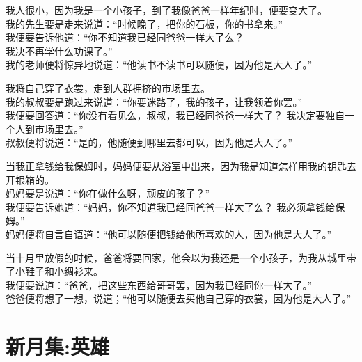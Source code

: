 \documentclass[]{book}
\renewenvironment{quote}{\begin{VF}}{\end{VF}}
\begin{document}
\begin{quote}
我人很小，因为我是一个小孩子，到了我像爸爸一样年纪时，便要变大了。\\
我的先生要是走来说道：``时候晚了，把你的石板，你的书拿来。''\\
我便要告诉他道：``你不知道我已经同爸爸一样大了么？\\
我决不再学什么功课了。''\\
我的老师便将惊异地说道：``他读书不读书可以随便，因为他是大人了。''

我将自己穿了衣裳，走到人群拥挤的市场里去。\\
我的叔叔要是跑过来说道：``你要迷路了，我的孩子，让我领着你罢。''\\
我便要回答道：``你没有看见么，叔叔，我已经同爸爸一样大了？
我决定要独自一个人到市场里去。''\\
叔叔便将说道：``是的，他随便到哪里去都可以，因为他是大人了。''

当我正拿钱给我保姆时，妈妈便要从浴室中出来，因为我是知道怎样用我的钥匙去开银箱的。\\
妈妈要是说道：``你在做什么呀，顽皮的孩子？''\\
我便要告诉她道：``妈妈，你不知道我已经同爸爸一样大了么？
我必须拿钱给保姆。''\\
妈妈便将自言自语道：``他可以随便把钱给他所喜欢的人，因为他是大人了。''

当十月里放假的时候，爸爸将要回家，他会以为我还是一个小孩子，为我从城里带了小鞋子和小绸衫来。\\
我便要说道：``爸爸，把这些东西给哥哥罢，因为我已经同你一样大了。''\\
爸爸便将想了一想，说道；``他可以随便去买他自己穿的衣裳，因为他是大人了。''
\end{quote}

\section{新月集:英雄}
\end{document}
